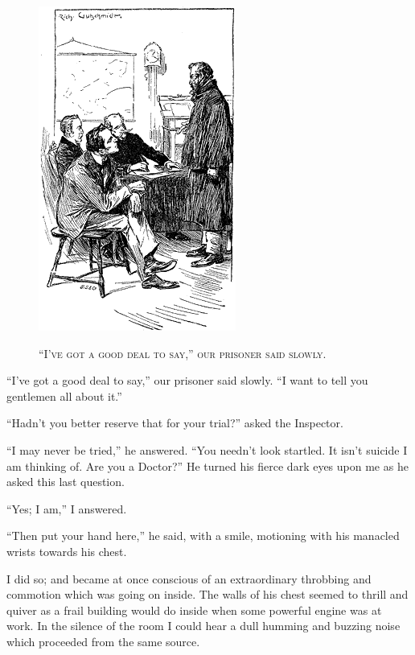 \documentclass[12pt,english,oneside]{book}
\newcommand{\noun}[1]{\textsc{#1}}
\begin{document}
%
\begin{figure}[htbp]
\noindent \begin{center}\includegraphics{images/study10-stud-22.png}\end{center}

\noindent \begin{center}\noun{{}``I've got a good deal to say,''
our prisoner said slowly.}\end{center}
\end{figure}
{}``I've got a good deal to say,'' our prisoner said slowly. {}``I
want to tell you gentlemen all about it.''

{}``Hadn't you better reserve that for your trial?'' asked the Inspector.

{}``I may never be tried,'' he answered. {}``You needn't look startled.
It isn't suicide I am thinking of. Are you a Doctor?'' He turned
his fierce dark eyes upon me as he asked this last question.

{}``Yes; I am,'' I answered.

{}``Then put your hand here,'' he said, with a smile, motioning
with his manacled wrists towards his chest.

I did so; and became at once conscious of an extraordinary throbbing
and commotion which was going on inside. The walls of his chest seemed
to thrill and quiver as a frail building would do inside when some
powerful engine was at work. In the silence of the room I could hear
a dull humming and buzzing noise which proceeded from the same source.
\end{document}
